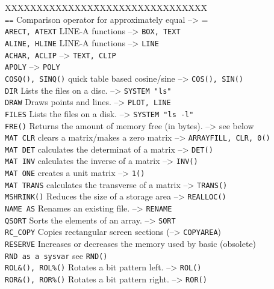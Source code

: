 \begin{tabbing}
XXXXXXXXXXXXXX\=XXXXXXXXXXXXXXXXXX\=\kill\\
\verb|==|\>		Comparison operator for approximately equal  --> =\\
\verb|ARECT, ATEXT|\>  LINE-A functions --> \verb|BOX, TEXT|\\
\verb|ALINE, HLINE|\>  LINE-A functions --> \verb|LINE|\\
\verb|ACHAR, ACLIP|\> --> \verb|TEXT, CLIP|\\
\verb|APOLY|       \> --> \verb|POLY|\\
\verb|COSQ(), SINQ()|\>	quick table based cosine/sine --> \verb|COS(), SIN()|\\
\verb|DIR|\>		Lists the files on a disc.  --> \verb|SYSTEM "ls"|\\
\verb|DRAW|\>	      Draws points and lines. --> \verb|PLOT, LINE|\\
\verb|FILES|\>		Lists the files on a disk.  --> \verb|SYSTEM "ls -l"|\\
\verb|FRE()|\>	        Returns the amount of memory free (in bytes). --> see below\\
\verb|MAT CLR|\>        clears a matrix/makes a zero matrix --> \verb|ARRAYFILL, CLR, 0()|\\
\verb|MAT DET|\>        calculates the determinat of a matrix --> \verb|DET()|\\
\verb|MAT INV|\>        calculates the inverse of a matrix --> \verb|INV()|\\
\verb|MAT ONE|\>        creates a unit matrix --> \verb|1()|\\
\verb|MAT TRANS|\>      calculates the transverse of a matrix --> \verb|TRANS()|\\
\verb|MSHRINK()|\>      Reduces the size of a storage area --> \verb|REALLOC()|\\
\verb|NAME AS|\>        Renames an existing file. --> \verb|RENAME|\\
\verb|QSORT|\>  	      Sorts  the elements of an array.  --> \verb|SORT|\\
\verb|RC_COPY|\>   	Copies rectangular screen sections  (--> \verb|COPYAREA|)\\
\verb|RESERVE|\>      	Increases or decreases the memory used by basic (obsolete)\\
\verb|RND as a sysvar|\>  see \verb|RND()|\\
\verb|ROL&(), ROL%()|\>  Rotates a bit pattern left. --> \verb|ROL()|\\
\verb|ROR&(), ROR%()|\>  Rotates a bit pattern right. --> \verb|ROR()|\\

\end{tabbing}
